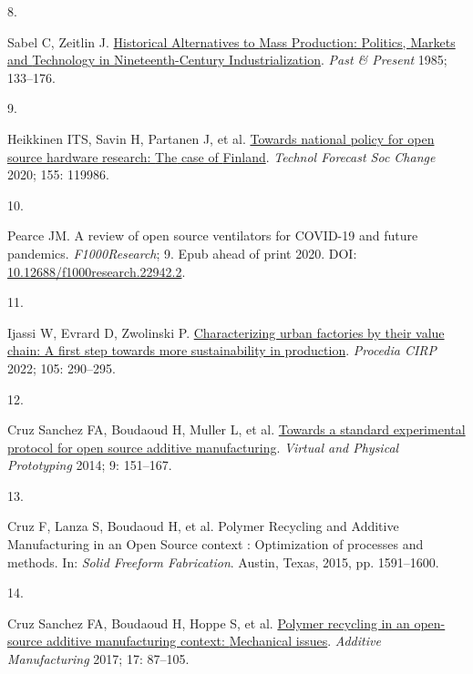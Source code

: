 \documentclass[
  11pt,
  a4paperpaper,
  onecolumn]{article}
\newlength{\cslhangindent}
\newlength{\csllabelwidth}
\newlength{\cslentryspacingunit} %
\newenvironment{CSLReferences}[2] %
 {%
  \setlength{\parindent}{0pt}
  \ifodd #1
  \let\oldpar\par
  \def\par{\hangindent=\cslhangindent\oldpar}
  \fi
  \setlength{\parskip}{#2\cslentryspacingunit}
 }%
 {}
\newcommand{\CSLLeftMargin}[1]{\parbox[t]{\csllabelwidth}{#1}}
\newcommand{\CSLRightInline}[1]{\parbox[t]{\linewidth - \csllabelwidth}{#1}\break}
\begin{document}
\begin{CSLReferences}{0}{0}
\leavevmode{}%
\CSLLeftMargin{8. }%
\CSLRightInline{Sabel C, Zeitlin J.
\href{https://www.jstor.org/stable/650576}{Historical {Alternatives} to
{Mass Production}: {Politics}, {Markets} and {Technology} in
{Nineteenth-Century Industrialization}}. \emph{Past \& Present} 1985;
133--176.}

\leavevmode{}%
\CSLLeftMargin{9. }%
\CSLRightInline{Heikkinen ITS, Savin H, Partanen J, et al.
\href{https://doi.org/10.1016/j.techfore.2020.119986}{Towards national
policy for open source hardware research: {The} case of {Finland}}.
\emph{Technol Forecast Soc Change} 2020; 155: 119986.}

\leavevmode{}%
\CSLLeftMargin{10. }%
\CSLRightInline{Pearce JM. A review of open source ventilators for
{COVID-19} and future pandemics. \emph{F1000Research}; 9. Epub ahead of
print 2020. DOI:
\href{https://doi.org/10.12688/f1000research.22942.2}{10.12688/f1000research.22942.2}.}

\leavevmode{}%
\CSLLeftMargin{11. }%
\CSLRightInline{Ijassi W, Evrard D, Zwolinski P.
\href{https://doi.org/10.1016/j.procir.2022.02.048}{Characterizing urban
factories by their value chain: A first step towards more sustainability
in production}. \emph{Procedia CIRP} 2022; 105: 290--295.}

\leavevmode{}%
\CSLLeftMargin{12. }%
\CSLRightInline{Cruz Sanchez FA, Boudaoud H, Muller L, et al.
\href{https://doi.org/10.1080/17452759.2014.919553}{Towards a standard
experimental protocol for open source additive manufacturing}.
\emph{Virtual and Physical Prototyping} 2014; 9: 151--167.}

\leavevmode{}%
\CSLLeftMargin{13. }%
\CSLRightInline{Cruz F, Lanza S, Boudaoud H, et al. Polymer {Recycling}
and {Additive Manufacturing} in an {Open Source} context :
{Optimization} of processes and methods. In: \emph{Solid {Freeform
Fabrication}}. {Austin, Texas}, 2015, pp. 1591--1600.}

\leavevmode{}%
\CSLLeftMargin{14. }%
\CSLRightInline{Cruz Sanchez FA, Boudaoud H, Hoppe S, et al.
\href{https://doi.org/10.1016/j.addma.2017.05.013}{Polymer recycling in
an open-source additive manufacturing context: {Mechanical} issues}.
\emph{Additive Manufacturing} 2017; 17: 87--105.}


\end{CSLReferences}
\end{document}
